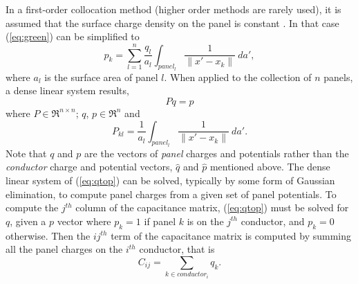 In a first-order collocation method (higher order methods are rarely
used), it is assumed that the surface charge density on the panel
is constant  \cite{rao}.  In that case (\ref{eq:green}) can be
simplified to
\begin{equation}
p_k = \sum_{l=1}^n 
\frac{q_l}{a_l} \int_{panel_l} \frac{1}{\| x' - x_k \| } \: da',
\label{eq:sgreen}
\end{equation}
where $ a_l $ is 
the surface area of panel $ l $.  
When applied to the collection of $ n $ panels, a dense linear system
results,
\begin{equation}
P q = p
\label{eq:qtop}
\end{equation}
where $ P \in \Re^{n\times n}$; $q$, $p\in \Re^n$ and
\begin{equation}
P_{kl} = \frac{1}{a_l} \int_{panel_l} \frac{1}{ \| x' - x_k \| }\: da'.
\label{eq:pcoeff}
\end{equation}
Note that $q$ and $p$ are the vectors of {\em panel} charges and
potentials rather than the {\em conductor} charge and potential
vectors, $\hat{q}$ and $\hat{p}$ mentioned above.  The dense linear
system of (\ref{eq:qtop}) can be solved, typically by some form of
Gaussian elimination, to compute panel charges from a given set of panel
potentials.  To compute the $ j^{th} $ column of the capacitance
matrix, (\ref{eq:qtop}) must be solved for $ q $, given a $ p $ vector
where $ p_k = 1 $ if panel $ k $ is on the $ j^{th} $ conductor, and $
p_k = 0 $ otherwise.  Then the $ ij^{th} $ term of the capacitance
matrix is computed by summing all the panel charges on the $ i^{th} $
conductor, that is
\begin{equation}
C_{ij} = \sum_{k \in conductor_i} q_k.
\end{equation}

